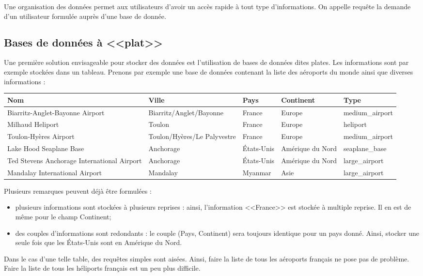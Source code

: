 \documentclass[10pt]{article}
\begin{document}
Une organisation des données permet aux utilisateurs d'avoir un accès rapide à tout type d'informations. On appelle requête la demande d'un utilisateur formulée auprès d'une base de donnée. 

\subsection{Bases de données à <<plat>>}
Une première solution envisageable pour stocker des données est l'utilisation de bases de données dites plates. Les informations sont par exemple stockées dans un tableau. Prenons par exemple une base de données contenant la liste des aéroports du monde ainsi que diverses informations : 
\begin{center}
\begin{tabular}{p{4cm}llll}
\hline
Nom & Ville & Pays & Continent  & Type \\
\hline
\hline
Biarritz-Anglet-Bayonne Airport & Biarritz/Anglet/Bayonne & France & Europe & medium\_airport \\
Milhaud Heliport & Toulon & France & Europe & heliport \\
Toulon-Hyères Airport & Toulon/Hyères/Le Palyvestre & France & Europe & medium\_airport \\
Lake Hood Seaplane Base & Anchorage & États-Unis & Amérique du Nord & seaplane\_base\\
Ted Stevens Anchorage International Airport & Anchorage & États-Unis & Amérique du Nord & large\_airport\\
Mandalay International Airport & Mandalay & Myanmar & Asie & large\_airport\\
\hline
\end{tabular}
\end{center}

Plusieurs remarques peuvent déjà être formulées : 
\begin{itemize}
\item plusieurs informations sont stockées à plusieurs reprises : ainsi, l'information <<France>> est stockée à multiple reprise. Il en est de même pour le champ Continent;
\item des couples d'informations sont redondants : le couple (Pays, Continent) sera toujours identique pour un pays donné. Ainsi, stocker une seule fois que les États-Unis sont en Amérique du Nord.
\end{itemize}

Dans le cas d'une telle table, des requêtes simples sont aisées. Ainsi, faire la liste de tous les aéroports français ne pose pas de problème. Faire la liste de tous les héliports français est un peu plus difficile. 
\end{document}
